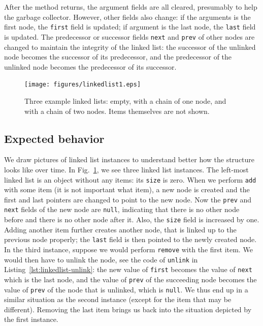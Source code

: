 \documentclass[runningheads]{llncs}
\theoremstyle{remark}
\begin{document}
After the method returns, the argument fields are all cleared, presumably to help the garbage collector. However, other fields also change: if the arguments is the first node, the \texttt{first} field is updated; if argument is the last node, the \texttt{last} field is updated. The predecessor or successor fields \texttt{next} and \texttt{prev} of other nodes are changed to maintain the integrity of the linked list: the successor of the unlinked node becomes the successor of its predecessor, and the predecessor of the unlinked node becomes the predecessor of its successor.

\begin{figure}
  \centering
  \texttt{[image: figures/linkedlist1.eps]}
  \caption{Three example linked lists: empty, with a chain of one node, and with a chain of two nodes. Items themselves are not shown.}
  \vspace*{-20pt}
  \label{fig:linkedlist}
\end{figure}

\subsection{Expected behavior}

We draw pictures of linked list instances to understand better how the structure looks like over time. In Fig.~\ref{fig:linkedlist}, we see three linked list instances. The left-most linked list is an object without any items: its \texttt{size} is zero. When we perform \texttt{add} with some item (it is not important what item), a new node is created and the first and last pointers are changed to point to the new node. Now the \texttt{prev} and \texttt{next} fields of the new node are \texttt{null}, indicating that there is no other node before and there is no other node after it. Also, the \texttt{size} field is increased by one. Adding another item further creates another node, that is linked up to the previous node properly; the \texttt{last} field is then pointed to the newly created node.
In the third instance, suppose we would perform \texttt{remove} with the first item. We would then have to unlink the node, see the code of \texttt{unlink} in Listing~\ref{lst:linkedlist-unlink}: the new value of \texttt{first} becomes the value of \texttt{next} which is the last node, and the value of \texttt{prev} of the succeeding node becomes the value of \texttt{prev} of the node that is unlinked, which is \texttt{null}. We thus end up in a similar situation as the second instance (except for the item that may be different). Removing the last item brings us back into the situation depicted by the first instance.
\end{document}
